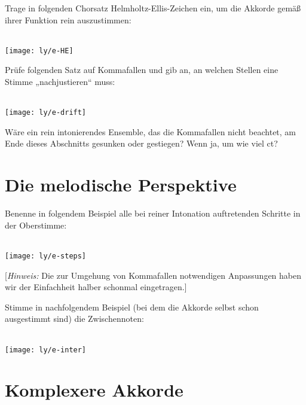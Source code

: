 \documentclass[ngerman,11pt]{scrartcl}
\begin{document}
\begin{aufg}
  Trage in folgenden Chorsatz Helmholtz-Ellis-Zeichen ein, um die Akkorde gemäß
  ihrer Funktion rein auszustimmen:
  \begin{center}
    \\[-\baselineskip]
    \texttt{[image: ly/e-HE]}
  \end{center}
\end{aufg}

\begin{aufg}
  Prüfe folgenden Satz auf Kommafallen und gib an, an welchen Stellen eine
  Stimme „nachjustieren“ muss:
  \begin{center}
    \\[-\baselineskip]
    \texttt{[image: ly/e-drift]}
  \end{center}
  Wäre ein rein intonierendes Ensemble, das die Kommafallen nicht beachtet, am
  Ende dieses Abschnitts gesunken oder gestiegen? Wenn ja, um wie viel ct?
\end{aufg}

\section{Die melodische Perspektive}

\begin{aufg}
  Benenne in folgendem Beispiel alle bei reiner Intonation auftretenden Schritte
  in der Oberstimme:
  \begin{center}
    \\[-\baselineskip]
    \texttt{[image: ly/e-steps]}
  \end{center}%
  [\emph{Hinweis:} Die zur Umgehung von Kommafallen notwendigen Anpassungen
  haben wir der Einfachheit halber schonmal eingetragen.]
\end{aufg}

\begin{aufg}
  Stimme in nachfolgendem Beispiel (bei dem die Akkorde selbst schon ausgestimmt
  sind) die Zwischennoten:
  \begin{center}
    \\[-\baselineskip]
    \texttt{[image: ly/e-inter]}
  \end{center}%
\end{aufg}

\pagebreak
\section{Komplexere Akkorde}
\end{document}
